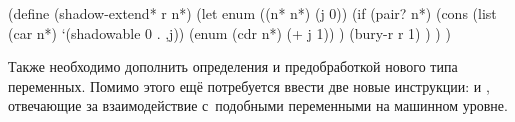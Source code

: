 \begin{code:lisp}
(define (shadow-extend* r n*)
  (let enum ((n* n*) (j 0))
    (if (pair? n*)
        (cons (list (car n*) `(shadowable 0 . ,j))
              (enum (cdr n*) (+ j 1)) )
        (bury-r r 1) ) ) )
\end{code:lisp}

Также необходимо дополнить определения  и
 предобработкой нового типа переменных. Помимо этого ещё
потребуется ввести две новые инструкции:  и ,
отвечающие за взаимодействие с~подобными переменными на машинном уровне.


